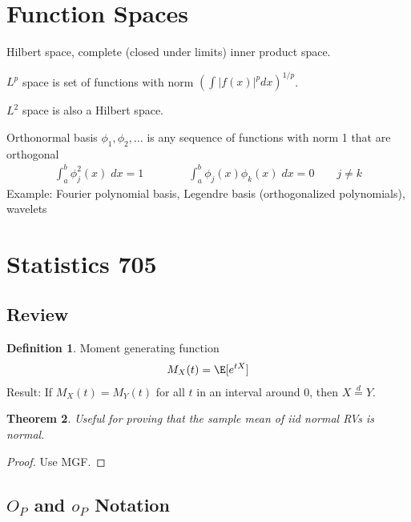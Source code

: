 \documentclass[12pt]{article}
\theoremstyle{plain}
\newtheorem{thm}{Theorem}[section]
\theoremstyle{definition}
\newtheorem{defn}[thm]{Definition}
\theoremstyle{remark}
\begin{document}
\clearpage
\section{Function Spaces}

Hilbert space, complete (closed under limits) inner product space.

$L^p$ space is set of functions with norm
$\left(\int |f(x)|^p dx\right)^{1/p}$.

$L^2$ space is also a Hilbert space.

Orthonormal basis $\phi_1,\phi_2,\ldots$ is any sequence of functions
with norm 1 that are orthogonal
\begin{align*}
  \int^b_a \phi_j^2(x)\;dx=1
  \qquad
  \qquad
  \int^b_a \phi_j(x)\phi_k(x)\;dx=0
  \qquad
  j\neq k
\end{align*}
Example: Fourier polynomial basis, Legendre basis (orthogonalized
polynomials), wavelets




\clearpage
\section{Statistics 705}

\subsection{Review}


\begin{defn}
Moment generating function
\begin{align*}
  M_X(t) = \E[e^{tX}]
\end{align*}
Result: If $M_X(t)=M_Y(t)$ for all $t$ in an interval around 0, then
$X\overset{d}{=}Y$.
\end{defn}

\begin{thm}
Useful for proving that the sample mean of iid normal RVs is normal.
\end{thm}
\begin{proof}
Use MGF.
\end{proof}





\subsection{$O_P$ and $o_P$ Notation}
\end{document}

